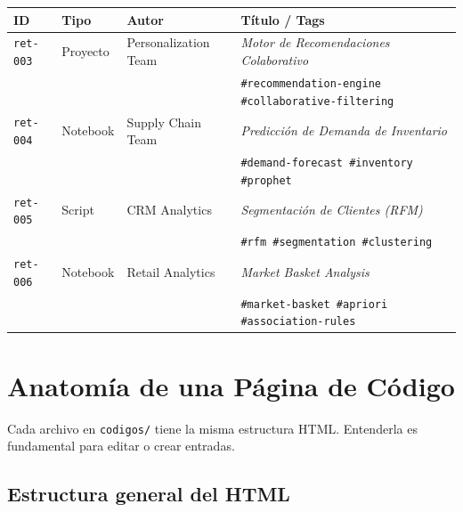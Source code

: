 \documentclass[12pt, a4paper]{article}
\newcommand{\archivo}[1]{\texttt{\textcolor{cpAccent}{#1}}}
\begin{document}
\begin{longtable}{lllp{5.5cm}}
\toprule
\textbf{ID} & \textbf{Tipo} & \textbf{Autor} & \textbf{Título / Tags} \\
\midrule
\endhead
\texttt{ret-003} & Proyecto & Personalization Team  & \textit{Motor de Recomendaciones Colaborativo}\\
                 &          &                       & \texttt{\#recommendation-engine \#collaborative-filtering} \\[6pt]
\texttt{ret-004} & Notebook & Supply Chain Team     & \textit{Predicción de Demanda de Inventario}\\
                 &          &                       & \texttt{\#demand-forecast \#inventory \#prophet} \\[6pt]
\texttt{ret-005} & Script   & CRM Analytics         & \textit{Segmentación de Clientes (RFM)}\\
                 &          &                       & \texttt{\#rfm \#segmentation \#clustering} \\[6pt]
\texttt{ret-006} & Notebook & Retail Analytics      & \textit{Market Basket Analysis}\\
                 &          &                       & \texttt{\#market-basket \#apriori \#association-rules} \\
\bottomrule
\end{longtable}


\section{Anatomía de una Página de Código}

Cada archivo en \archivo{codigos/} tiene la misma estructura HTML.
Entenderla es fundamental para editar o crear entradas.

\subsection{Estructura general del HTML}
\end{document}
